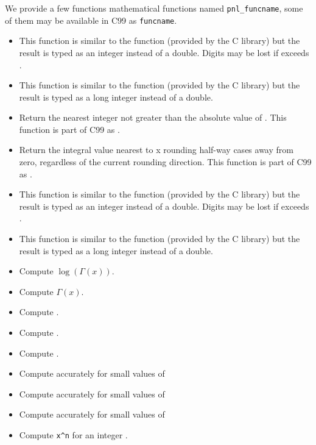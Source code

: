 We provide a few functions mathematical functions named \verb+pnl_funcname+,
some of them may be available in C99 as \verb+funcname+.
\begin{itemize}
  \item {}
    \sshortdescribe This function is similar to the  function
    (provided by the C library) but the result is typed as an integer instead of a
    double. Digits may be lost if  exceeds .
  \item {}
    \sshortdescribe This function is similar to the  function
    (provided by the C library) but the result is typed as a long integer instead of a
    double. 
  \item {}
    \sshortdescribe Return the nearest integer not greater than the absolute
    value of . This function is part of C99 as .
  \item {}
    \sshortdescribe Return the integral value nearest to x rounding
    half-way cases away from zero, regardless of the current rounding
    direction. This function is part of C99 as .
  \item {}
    \sshortdescribe This function is similar to the  function
    (provided by the C library) but the result is typed as an integer instead of a
    double. Digits may be lost if  exceeds .
  \item {}
    \sshortdescribe This function is similar to the  function
    (provided by the C library) but the result is typed as a long integer instead of a
    double. 
  \item {}
    \sshortdescribe Compute $\log(\Gamma(x))$.
  \item {}
    \sshortdescribe Compute $\Gamma(x)$.
  \item {}
    \sshortdescribe Compute .
  \item {}
    \sshortdescribe Compute .
  \item {}
    \sshortdescribe Compute .
  \item {}
    \sshortdescribe Compute  accurately for small values of 
  \item {}
    \sshortdescribe Compute  accurately for small values of 
  \item {}
    \sshortdescribe Compute  accurately for small values of 
  \item {}
    \sshortdescribe Compute \verb!x^n! for an integer .
\end{itemize}

